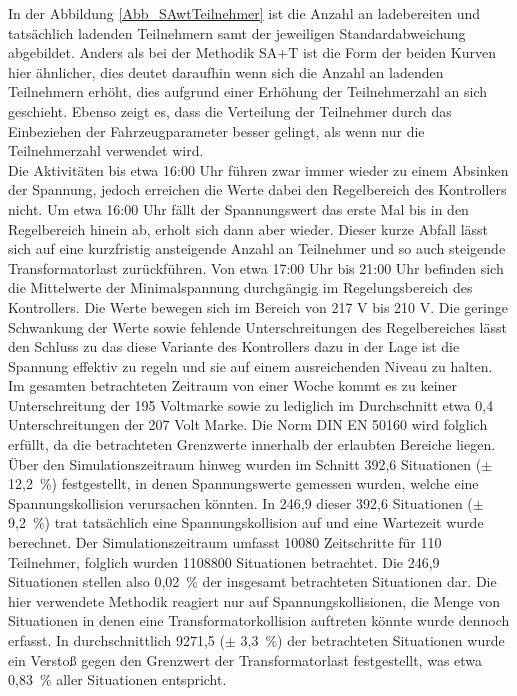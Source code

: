 In der Abbildung \ref{Abb_SAwtTeilnehmer} ist die Anzahl an ladebereiten und tatsächlich ladenden Teilnehmern samt der jeweiligen Standardabweichung abgebildet. Anders als bei der Methodik SA+T ist die Form der beiden Kurven hier ähnlicher, dies deutet daraufhin wenn sich die Anzahl an ladenden Teilnehmern erhöht, dies aufgrund einer Erhöhung der Teilnehmerzahl an sich geschieht. Ebenso zeigt es, dass die Verteilung der Teilnehmer durch das Einbeziehen der Fahrzeugparameter besser gelingt, als wenn nur die Teilnehmerzahl verwendet wird. \\
Die Aktivitäten bis etwa 16:00 Uhr führen zwar immer wieder zu einem Absinken der Spannung, jedoch erreichen die Werte dabei den Regelbereich des Kontrollers nicht. Um etwa 16:00 Uhr fällt der Spannungswert das erste Mal bis in den Regelbereich hinein ab, erholt sich dann aber wieder. Dieser kurze Abfall lässt sich auf eine kurzfristig ansteigende Anzahl an Teilnehmer und so auch steigende Transformatorlast zurückführen. Von etwa 17:00 Uhr bis 21:00 Uhr befinden sich die Mittelwerte der Minimalspannung durchgängig im Regelungsbereich des Kontrollers. Die Werte bewegen sich im Bereich von 217 V bis 210 V. Die geringe Schwankung der Werte sowie fehlende Unterschreitungen des Regelbereiches lässt den Schluss zu das diese Variante des Kontrollers dazu in der Lage ist die Spannung effektiv zu regeln und sie auf einem ausreichenden Niveau zu halten.
Im gesamten betrachteten Zeitraum von einer Woche kommt es zu keiner Unterschreitung der 195 Voltmarke sowie zu lediglich im Durchschnitt etwa 0,4 Unterschreitungen der 207 Volt Marke. Die Norm DIN EN 50160 wird folglich erfüllt, da die betrachteten Grenzwerte innerhalb der erlaubten Bereiche liegen.\\
Über den Simulationszeitraum hinweg wurden im Schnitt 392,6 Situationen ($\pm$ 12,2~\%) festgestellt, in denen Spannungswerte gemessen wurden, welche eine Spannungskollision verursachen könnten. In 246,9 dieser 392,6 Situationen ($\pm$ 9,2~\%) trat tatsächlich eine Spannungskollision auf und eine Wartezeit wurde berechnet. Der Simulationszeitraum umfasst 10080 Zeitschritte für 110 Teilnehmer, folglich wurden 1108800 Situationen betrachtet. Die 246,9 Situationen stellen also 0,02~\% der insgesamt betrachteten Situationen dar. Die hier verwendete Methodik reagiert nur auf Spannungskollisionen, die Menge von Situationen in denen eine Transformatorkollision auftreten könnte wurde dennoch erfasst. In durchschnittlich 9271,5 ($\pm$ 3,3~\%) der betrachteten Situationen wurde ein Verstoß gegen den Grenzwert der Transformatorlast festgestellt, was etwa 0,83~\% aller Situationen entspricht.\\
